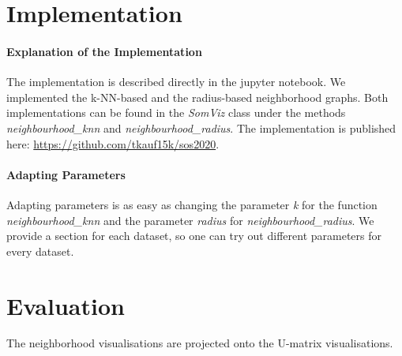 \documentclass[12pt]{article}
\begin{document}
\maketitle

\section{Implementation}
\paragraph*{Explanation of the Implementation}
The implementation is described directly in the jupyter notebook.
We implemented the k-NN-based and the radius-based neighborhood graphs.
Both implementations can be found in the \textit{SomViz} class under the methods \textit{neighbourhood\_knn} and \textit{neighbourhood\_radius}.
The implementation is published here: \href{https://github.com/tkauf15k/sos2020}{https://github.com/tkauf15k/sos2020}.

\paragraph*{Adapting Parameters}
Adapting parameters is as easy as changing the parameter \textit{k} for the function \textit{neighbourhood\_knn} and the parameter \textit{radius} for \textit{neighbourhood\_radius}.
We provide a section for each dataset, so one can try out different parameters for every dataset.

\section{Evaluation}
The neighborhood visualisations are projected onto the U-matrix visualisations.
\end{document}

